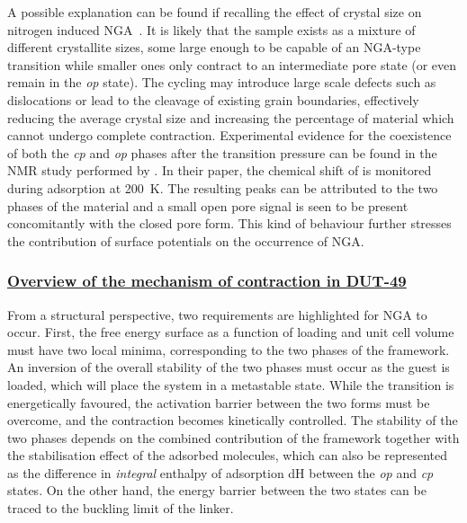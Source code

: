 A possible explanation can be found if recalling the effect 
of crystal size on nitrogen induced 
\gls{NGA}~\cite{krauseEffectCrystalliteSize2018}. It is likely 
that the sample exists as a mixture of different crystallite
sizes, some large enough to be capable of an \gls{NGA}-type transition 
while smaller ones only contract to an intermediate pore state
(or even remain in the \textit{op} state).
The cycling may introduce large scale defects such as dislocations
or lead to the cleavage of existing grain boundaries, 
effectively reducing the average crystal size
and increasing the percentage of material which cannot undergo 
complete contraction.
Experimental evidence for the coexistence of both the \textit{cp} and 
\textit{op} phases after the transition pressure can be found in the 
 \gls{NMR} study performed 
by \citet{schaberSituMonitoringUnique2017}. In their paper,
the chemical shift of  is monitored during
adsorption at \SI{200}{\kelvin}. The resulting peaks can be attributed
to the two phases of the material and a small
open pore signal is seen to be present concomitantly with the 
closed pore form.
This kind of behaviour further stresses the 
contribution of surface potentials on the occurrence of \gls{NGA}.

\subsubsection{\underline{Overview of the mechanism of contraction in DUT-49}}

From a structural perspective, two requirements are 
highlighted for \gls{NGA} to occur.
First, the free energy surface as a function of loading and 
unit cell volume must have two local minima, corresponding to the 
two phases of the framework. An inversion of the overall stability
of the two phases must occur as the guest is loaded, which will 
place the system in a metastable state. While the transition
is energetically favoured, the activation barrier between the 
two forms must be overcome, and the contraction becomes 
kinetically controlled. The stability of the two phases 
depends on the combined contribution of the framework together
with the stabilisation effect of the adsorbed molecules,
which can also be represented as the
difference in \textit{integral} enthalpy of adsorption \gls{dH} between the 
\textit{op} and \textit{cp} states. On the other hand, the 
energy barrier between the two states can be traced to the 
buckling limit of the linker.
